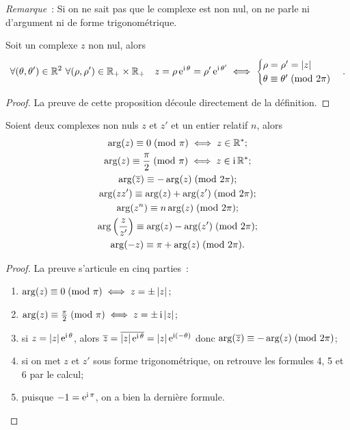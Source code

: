 \emph{Remarque}~: Si on ne sait pas que le complexe est non nul, on ne parle ni d'argument ni de forme trigonométrique.
\begin{prop}
  Soit un complexe \(z\) non nul, alors
  \begin{equation}
    \forall (\theta, \theta') \in \mathbb{R}^2 \ \forall (\rho, \rho') \in \mathbb{R}_{+} \times \mathbb{R}_{+} \quad z=\rho \operatorname{e}^{\operatorname{i} \theta}=\rho' \operatorname{e}^{\operatorname{i} \theta'} \iff
    \begin{cases}
      \rho = \rho' = \left\lvert z\right\rvert \\
      \theta \equiv \theta'\!\pmod {2\pi}
    \end{cases}.
  \end{equation}
\end{prop}
\begin{proof}
  La preuve de cette proposition découle directement de la définition.
\end{proof}
%
\begin{prop}
  Soient deux complexes non nuls \(z\) et \(z'\) et un entier relatif \(n\), alors
  \begin{gather}
    \arg(z) \equiv 0\!\pmod {\pi} \iff z \in \mathbb{R}^*;\\
    \arg(z) \equiv \frac{\pi}{2}\!\pmod {\pi} \iff z \in \operatorname{i}\mathbb{R}^{*};\\
    \arg(\overline{z}) \equiv -\arg(z)\!\pmod {2\pi};\\
    \arg(z z') \equiv \arg(z) + \arg(z')\!\pmod {2\pi};\\
    \arg(z^n) \equiv n \arg(z)\!\pmod {2\pi};\\
    \arg \left(\frac{z}{z'} \right) \equiv \arg(z) - \arg(z') \!\pmod {2\pi};\\
    \arg(-z) \equiv \pi + \arg(z)\!\pmod {2\pi}.
  \end{gather}
\end{prop}
\begin{proof}
  La preuve s'articule en cinq parties~:
  \begin{enumerate}
  \item \(\arg(z) \equiv 0\!\pmod {\pi} \iff z = \pm \left\lvert z\right\rvert\);
  \item \(\arg(z) \equiv \frac{\pi}{2}\!\pmod {\pi} \iff z = \pm \operatorname{i} \left\lvert z\right\rvert\);
  \item si \(z=\left\lvert z\right\rvert \operatorname{e}^{\operatorname{i} \theta}\), alors \(\overline{z}=\overline{|z| \operatorname{e}^{\operatorname{i} \theta}}=|z| \operatorname{e}^{\operatorname{i} (-\theta)}\) donc \(\arg(\overline{z}) \equiv -\arg(z)\!\pmod {2\pi}\);
  \item si on met \(z\) et \(z'\) sous forme trigonométrique, on retrouve les formules 4, 5 et 6 par le calcul;
  \item puisque \(-1=\operatorname{e}^{\operatorname{i} \pi}\), on a bien la dernière formule.
  \end{enumerate}
\end{proof}

